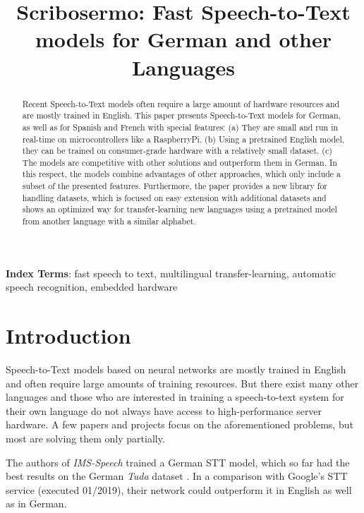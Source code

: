 \title{Scribosermo: Fast Speech-to-Text models for German and other Languages}



\maketitle
  
\begin{abstract}
	Recent Speech-to-Text models often require a large amount of hardware resources and are mostly trained in English. This paper presents Speech-to-Text models for German, as well as for Spanish and French with special features:
	(a) They are small and run in real-time on microcontrollers like a RaspberryPi.
	(b) Using a pretrained English model, they can be trained on consumer-grade hardware with a relatively small dataset.
	(c) The models are competitive with other solutions and outperform them in German.
	In this respect, the models combine advantages of other approaches, which only include a subset of the presented features.
	Furthermore, the paper provides a new library for handling datasets, which is focused on easy extension with additional datasets and shows an optimized way for transfer-learning new languages using a pretrained model from another language with a similar alphabet.
\end{abstract}

\noindent\textbf{Index Terms}: fast speech to text, multilingual transfer-learning, automatic speech recognition, embedded hardware

\section{Introduction}
\label{sec:intro}

Speech-to-Text models based on neural networks are mostly trained in English and often require large amounts of training resources. But there exist many other languages and those who are interested in training a speech-to-text system for their own language do not always have access to high-performance server hardware. A few papers and projects focus on the aforementioned problems, but most are solving them only partially.

\vspace{9pt}
The authors of \textit{IMS-Speech} \cite{IMSDE} trained a German STT model, which so far had the best results on the German \textit{Tuda} dataset \cite{TUDA}. In a comparison with Google's STT service (executed 01/2019), their network could outperform it in English as well as in German.


